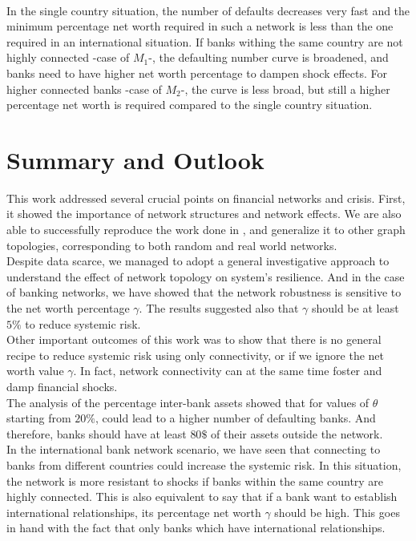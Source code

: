 \documentclass[14pt]{article}
\begin{document}
\\ In the single country situation, the number of defaults decreases very fast and the minimum percentage net worth required in such a network is less than the one required in an international situation. If banks withing the same country are not highly connected -case of $M_1$-, the defaulting number curve is broadened, and banks need to have higher net worth percentage to dampen shock effects. For higher connected banks -case of $M_2$-, the curve is less broad, but still a higher percentage net worth is required compared to the single country situation.
\section{Summary and Outlook}
This work addressed several crucial points on financial networks and crisis. First, it showed the importance of network structures and network effects. We are also able to successfully reproduce the work done in \cite{art1}, and generalize it to other graph topologies, corresponding to both random and real world networks.
\\ Despite data scarce, we managed to adopt a general investigative approach to understand the effect of network topology on system's resilience. And in the case of banking networks, we have showed that the network robustness is sensitive to the net worth percentage $\gamma$. The results suggested also that $\gamma$ should be at least $5\%$ to reduce systemic risk.
\\ Other important outcomes of this work was to show that there is no general recipe to reduce systemic risk using only connectivity, or if we ignore the net worth value $\gamma$. In fact, network connectivity can at the same time foster and damp financial shocks. 
\\ The analysis of the percentage inter-bank assets showed that for values of $\theta$ starting from $20\%$, could lead to a higher number of defaulting banks. And therefore, banks should have at least $80\$$ of their assets outside the network. 
\\ In the international bank network scenario, we have seen that connecting to banks from different countries could increase the systemic risk. In this situation, the network is more resistant to shocks if banks within the same country are highly connected. This is also equivalent to say that if a bank want to establish international relationships, its percentage net worth $\gamma$ should be high. This goes in hand with the fact that only  banks which have international relationships.
\end{document}
